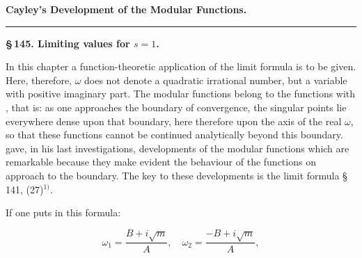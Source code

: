 \begin{center}
{\large{}}

{\Large\textbf{Cayley's Development of the Modular Functions.}}

\rule{0.3\textwidth}{0.4pt}

\textbf{\S\,145. Limiting values for $s = 1$.}
\end{center}

In this chapter a function-theoretic application of the limit formula is to be given. Here, therefore, $\omega$ does not denote a quadratic irrational number, but a variable with positive imaginary part. The modular functions belong to the functions with , that is: as one approaches the boundary of convergence, the singular points lie everywhere dense upon that boundary, here therefore upon the axis of the real $\omega$, so that these functions cannot be continued analytically beyond this boundary.  gave, in his last investigations, developments of the modular functions which are remarkable because they make evident the behaviour of the functions on approach to the boundary. The key to these developments is the limit formula § 141, (27)$^{1)}$.

If one puts in this formula:

\[
\omega_1 = \frac{B+i\sqrt m}{A}, \quad \omega_2 = \frac{-B+i\sqrt m}{A},
\]


\begingroup\renewcommand{\thefootnote}{1)}\endgroup
